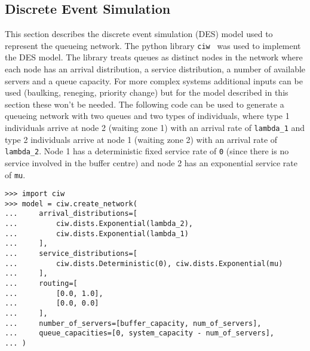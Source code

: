 \subsection{Discrete Event Simulation}
This section describes the discrete event simulation (DES) model used to
represent the queueing network.
The python library \lstinline[style=pystyle]{ciw}~\cite{ciwpython, ciwarticle}
was used to implement the DES model.
The library treats queues as distinct nodes in the network where each node has
an arrival distribution, a service distribution, a number of available servers
and a queue capacity.
For more complex systems additional inputs can be used (baulking, reneging,
priority change) but for the model described in this section these won't be
needed.
The following code can be used to generate a queueing network with two
queues and two types of individuals, where type 1 individuals arrive at node
2 (waiting zone 1) with an arrival rate of \lstinline[style=pystyle]{lambda_1}
and type 2 individuals arrive at node 1 (waiting zone 2) with an arrival rate of
\lstinline[style=pystyle]{lambda_2}.
Node 1 has a deterministic fixed service rate of \lstinline[style=pystyle]{0}
(since there is no service involved in the buffer centre) and node 2 has an
exponential service rate of \lstinline[style=pystyle]{mu}.

\begin{lstlisting}[style=pystyle]
>>> import ciw
>>> model = ciw.create_network(
...     arrival_distributions=[
...         ciw.dists.Exponential(lambda_2),
...         ciw.dists.Exponential(lambda_1)
...     ],
...     service_distributions=[
...         ciw.dists.Deterministic(0), ciw.dists.Exponential(mu)
...     ],
...     routing=[
...         [0.0, 1.0],
...         [0.0, 0.0]
...     ],
...     number_of_servers=[buffer_capacity, num_of_servers],
...     queue_capacities=[0, system_capacity - num_of_servers],
... )
\end{lstlisting}

